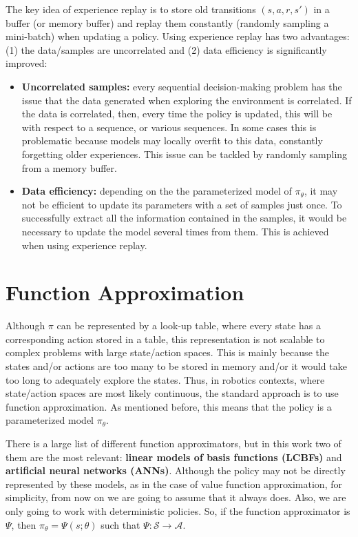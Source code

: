 The key idea of experience replay is to store old transitions $(s, a, r, s')$ in a buffer (or memory buffer) and replay them constantly (randomly sampling a mini-batch) when updating a policy. Using experience replay has two advantages: (1) the data/samples are uncorrelated and (2) data efficiency is significantly improved:

\begin{itemize}
    \item \textbf{Uncorrelated samples:} every sequential decision-making problem has the issue that the data generated when exploring the environment is correlated. If the data is correlated, then, every time the policy is updated, this will be with respect to a sequence, or various sequences. In some cases this is problematic because models may locally overfit to this data, constantly forgetting older experiences. This issue can be tackled by randomly sampling from a memory buffer.
    
    \item\textbf{Data efficiency:} depending on the the parameterized model of $\pi_{\theta}$, it may not be efficient to update its parameters with a set of samples just once. To successfully extract all the information contained in the samples, it would be necessary to update the model several times from them. This is achieved when using experience replay.
\end{itemize}

\section[Function Approximation]{Function Approximation \cite{kober2013reinforcement, sutton2018reinforcement}}
Although $\pi$ can be represented by a look-up table, where every state has a corresponding action stored in a table, this representation is not scalable to complex problems with large state/action spaces. This is mainly because the states and/or actions are too many to be stored in memory and/or it would take too long to adequately explore the states. Thus, in robotics contexts, where state/action spaces are most likely continuous, the standard approach is to use function approximation. As mentioned before, this means that the policy is a parameterized model $\pi_{\theta}$.

There is a large list of different function approximators, but in this work two of them are the most relevant: \textbf{linear models of basis functions (LCBFs)} and \textbf{artificial neural networks (ANNs)}. Although the policy may not be directly represented by these models, as in the case of value function approximation, for simplicity, from now on we are going to assume that it always does. Also, we are only going to work with deterministic policies. So, if the function approximator is $\Psi$, then $\pi_{\theta} = \Psi(s;\theta)$ such that $\Psi: \mathcal{S} \to \mathcal{A}$.

